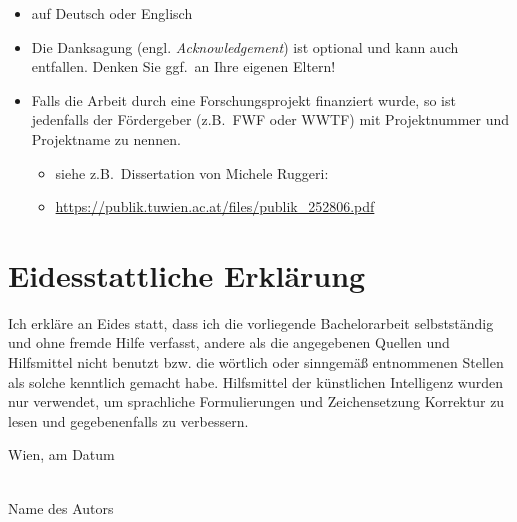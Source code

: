 \begin{itemize}
\item auf Deutsch oder Englisch
\item Die Danksagung (engl. {\em Acknowledgement}) ist optional und kann auch entfallen. Denken Sie ggf.\ an Ihre eigenen Eltern!

\item Falls die Arbeit durch eine Forschungsprojekt finanziert wurde, so ist jedenfalls der Fördergeber (z.B.\ FWF oder WWTF) mit Projektnummer und Projektname zu nennen.
\begin{itemize}
\item siehe z.B.\ Dissertation von Michele Ruggeri:
\item[] \href{https://publik.tuwien.ac.at/files/publik_252806.pdf}{\ttfamily https://publik.tuwien.ac.at/files/publik\_252806.pdf}
\end{itemize}

\end{itemize}

\cleardoublepage


\chapter*{Eidesstattliche Erkl\"arung}
\thispagestyle{empty}

\vspace*{2cm}

Ich erkl\"are an Eides statt, dass ich die vorliegende Bachelorarbeit selbstst\"andig und ohne fremde Hilfe verfasst, andere als die angegebenen Quellen und Hilfsmittel nicht benutzt bzw. die w\"ortlich oder sinngem\"a{\ss} entnommenen Stellen als solche kenntlich gemacht habe.
Hilfsmittel der künstlichen Intelligenz wurden nur verwendet, 
um sprachliche Formulierungen und Zeichensetzung Korrektur zu lesen und gegebenenfalls zu verbessern.

\vspace*{3cm}

\noindent
Wien, am {\color{change}Datum} %
%
\hfill 
%
\begin{minipage}[t]{5cm}
\centering
\underline{\hspace*{5cm}}\\
\small\color{change}Name des Autors
\end{minipage}

\cleardoublepage